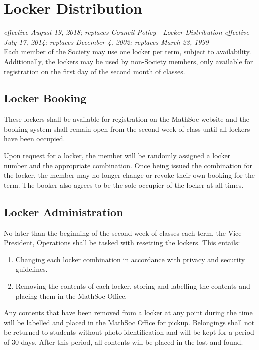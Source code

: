 \section{Locker Distribution}
\emph{effective August 19, 2018; replaces Council Policy---Locker Distribution
    effective July 17, 2014; replaces December 4, 2002; replaces March 23,
    1999}\\

Each member of the Society may use one locker per term, subject to
availability. Additionally, the lockers may be used by non-Society members,
only available for registration on the first day of the second month of
classes.

\subsection{Locker Booking}
These lockers shall be available for registration on the MathSoc website and
the booking system shall remain open from the second week of class until all
lockers have been occupied.

Upon request for a locker, the member will be randomly assigned a locker number
and the appropriate combination. Once being issued the combination for the
locker, the member may no longer change or revoke their own booking for the
term. The booker also agrees to be the sole occupier of the locker at all
times.

\subsection{Locker Administration}
No later than the beginning of the second week of classes each term, the Vice
President, Operations shall be tasked with resetting the lockers. This entails:

\begin{enumerate}
    \item Changing each locker combination in accordance with privacy and security
        guidelines.
    \item Removing the contents of each locker, storing and labelling the contents
        and placing them in the MathSoc Office.
\end{enumerate}

Any contents that have been removed from a locker at any point during the time
will be labelled and placed in the MathSoc Office for pickup. Belongings shall
not be returned to students without photo identification and will be kept for a
period of 30 days. After this period, all contents will be placed in the lost
and found.

